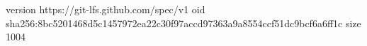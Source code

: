 version https://git-lfs.github.com/spec/v1
oid sha256:8bc5201468d5c1457972ea22c30f97accd97363a9a8554ccf51dc9bcf6a6ff1c
size 1004
